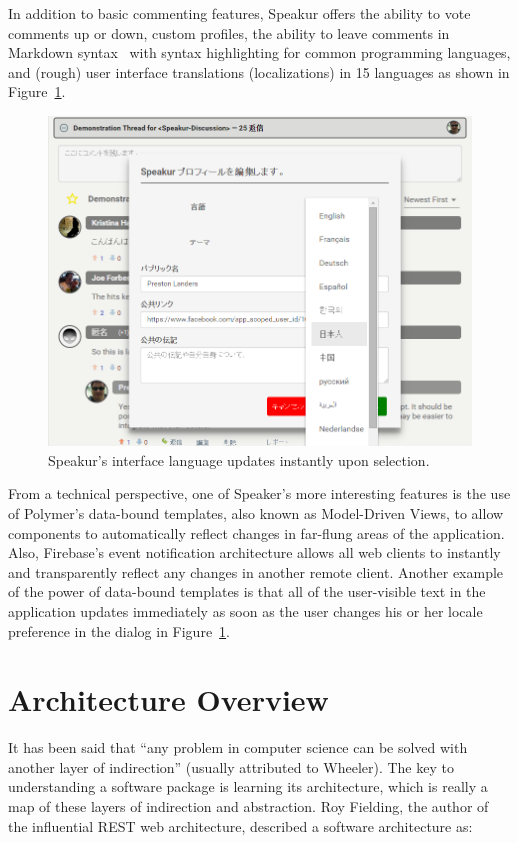 In addition to basic commenting features, Speakur offers the ability to vote comments up or down, custom profiles, 
the ability to leave comments in Markdown syntax~\cite{githubcontributors2015} with syntax highlighting for common programming languages, 
and (rough) user interface translations 
(localizations) 
in 15 languages as shown in Figure~\ref{f:lang}.

\begin{figure}[htb]
\centering
 \includegraphics[width=5.5in]{images/screenshot_20150320_1923_lang.png}
\caption{Speakur's interface language updates instantly upon selection.}
\label{f:lang}
\end{figure}


From a technical perspective, one of Speaker's more interesting features is the use of Polymer's data-bound templates, also known as Model-Driven Views, 
to allow components to automatically reflect changes in far-flung areas of the application.
Also, Firebase's event notification architecture allows all web clients to instantly and transparently reflect any changes in another remote client.
Another example of the power of data-bound templates is that all of the user-visible text in the application updates immediately as soon as the user changes his or her locale preference in the dialog in Figure~\ref{f:lang}.

\section{Architecture Overview}
It has been said that ``any problem in computer science can be solved with another layer of indirection'' (usually attributed to Wheeler).
The key to understanding a software package is learning its architecture,
which is really a map of these layers of indirection and abstraction.
Roy Fielding, the author of the influential REST web architecture, described a software architecture as:

